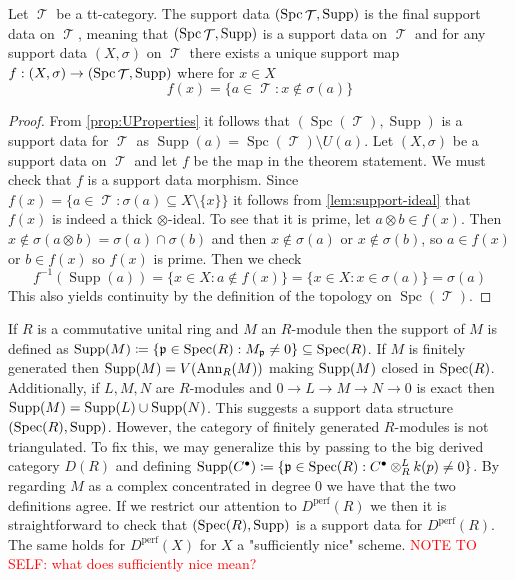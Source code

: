 \documentclass[11pt]{article}
\DeclareMathOperator{\TT}{\mathcal{T}}
\DeclareMathOperator{\supp}{Supp}
\DeclareMathOperator{\spc}{Spc}
\begin{document}
\begin{thm}\label{thm:universal-support}
Let $\TT$ be a tt-category. The support data $(\spc \TT, \Supp)$ is the final support data on $\TT$, meaning that $(\spc \TT, \Supp)$ is a support data on $\TT$ and for any support data $(X,\sigma)$ on $\TT$ there exists a unique support map $f:(X,\sigma) \to (\spc \TT, \Supp)$ where for $x \in X$
\[
	f(x) = \{a \in \TT: x \not \in \sigma(a)\}
\] 
\end{thm}
\begin{proof}
From \autoref{prop:UProperties} it follows that $(\spc(\TT),\supp)$ is a support data for $\TT$ as $\supp(a) = \spc(\TT) \setminus U(a)$. Let $(X,\sigma)$ be a support data on $\TT$ and let $f$ be the map in the theorem statement. We must check that $f$ is a support data morphism. Since $f(x) = \{a \in \TT: \sigma(a) \subseteq X \setminus \{x\}\}$ it follows from \autoref{lem:support-ideal} that $f(x)$ is indeed a thick $\otimes$-ideal. To see that it is prime, let $a \otimes b \in f(x)$. Then $x \not\in \sigma(a \otimes b) = \sigma(a) \cap \sigma(b)$ and then $x  \not\in \sigma(a)$ or $x \not\in \sigma(b)$, so $a \in f(x)$ or $b \in f(x)$ so $f(x)$ is prime. Then we check
\[
	f^{-1}(\supp(a)) = \{x \in X: a \not\in f(x)\} = \{x \in X: x \in \sigma(a)\} = \sigma(a)
\]
This also yields continuity by the definition of the topology on $\spc(\TT)$.
\end{proof}

\begin{xmpl}
If $R$ is a commutative unital ring and $M$ an $R$-module then the support of $M$ is defined as $\operatorname{Supp}(M) \coloneqq \{{\mathfrak p} \in \operatorname{Spec}(R): M_{\mathfrak p} \not = 0\} \subseteq \operatorname{Spec}(R)$. If $M$ is finitely generated then $\operatorname{Supp}(M) = V(\operatorname{Ann}_R(M))$ making $\operatorname{Supp}(M)$ closed in $\operatorname{Spec}(R)$. Additionally, if $L,M,N$ are $R$-modules and $0 \to L \to M \to N \to 0$ is exact then $\operatorname{Supp}(M) = \operatorname{Supp}(L) \cup \operatorname{Supp}(N)$. This suggests a support data structure $(\operatorname{Spec}(R),\operatorname{Supp})$.
However, the category of finitely generated $R$-modules is not triangulated. To fix this, we may generalize this by passing to the big derived category $D(R)$ and defining $\operatorname{Supp}(C^\bullet) \coloneqq \{{\mathfrak p} \in \operatorname{Spec}(R): C^\bullet \otimes_R^L k(p) \not = 0\}$. By regarding $M$ as a complex concentrated in degree 0 we have that the two definitions agree. If we restrict our attention to $D^{\text{perf}}(R)$ we then it is straightforward to check that $(\operatorname{Spec}(R),\operatorname{Supp})$ is a support data for $D^{\text{perf}}(R)$. The same holds for $D^{\text{perf}}(X)$ for $X$ a "sufficiently nice" scheme. \textcolor{red}{NOTE TO SELF: what does sufficiently nice mean?} 
\end{xmpl}
\end{document}
